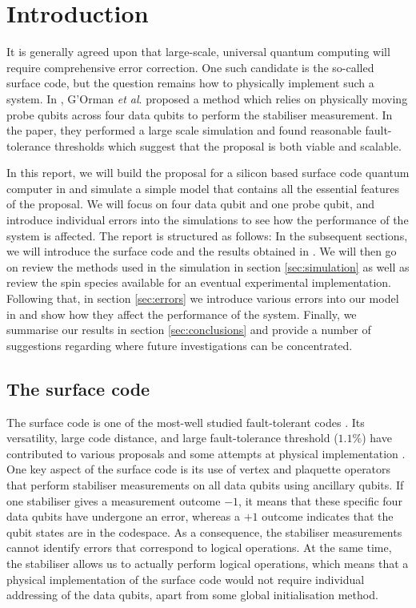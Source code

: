 \section{Introduction} \label{sec:Introduction}

It is generally agreed upon that large-scale, universal quantum computing will require comprehensive error correction. One such candidate is the so-called surface code, but the question remains how to physically implement such a system. In \cite{OGorman2016}, G'Orman \textit{et al}. proposed a method which relies on physically moving probe qubits across four data qubits to perform the stabiliser measurement. In the paper, they performed a large scale simulation and found reasonable fault-tolerance thresholds which suggest that the proposal is both viable and scalable. 

In this report, we will build the proposal for a silicon based surface code quantum computer in  \cite{OGorman2016} and simulate a simple model that contains all the essential features of the proposal. We will focus on four data qubit and one probe qubit, and introduce individual errors into the simulations to see how the performance of the system is affected. 
The report is structured as follows: In the subsequent sections, we will introduce the surface code and the results obtained in \citet{OGorman2016}. We will then go on review the methods used in the simulation in section \@ \ref{sec:simulation} as well as review the spin species available for an eventual experimental implementation. Following that, in section \@ \ref{sec:errors} we introduce various errors into our model in and show how they affect the performance of the system. Finally, we summarise our results in section \@ \ref{sec:conclusions} and provide a number of suggestions regarding where future investigations can be concentrated. 

\subsection{The surface code}
The surface code is one of the most-well studied fault-tolerant codes \cite{Wang2011,Fowler2012}. Its versatility, large code distance, and large fault-tolerance threshold ($1.1\%$) have contributed to various proposals \cite{Fowler2012,Pica2014,Tosi2015,Hill2015,OGorman2016} and some attempts at physical implementation \cite{Barends2014,Kelly2015}. One key aspect of the surface code is its use of vertex and plaquette operators that perform stabiliser measurements on all data qubits using ancillary qubits. If one stabiliser gives a measurement outcome $-1$, it means that these specific four data qubits have undergone an error, whereas a $+1$ outcome indicates that the qubit states are in the codespace. As a consequence, the stabiliser measurements cannot identify errors that correspond to logical operations. At the same time, the stabiliser allows us to actually perform logical operations, which means that a physical implementation of the surface code would not require individual addressing of the data qubits, apart from some global initialisation method. 

